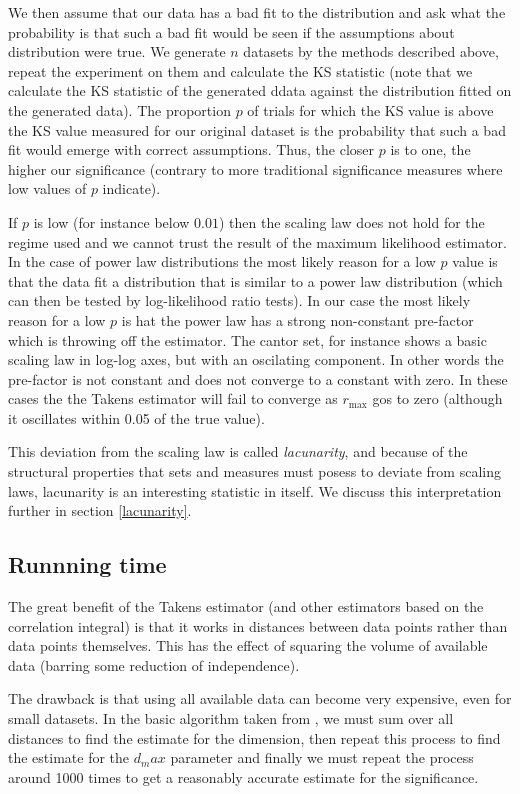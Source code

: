 \documentclass[11pt]{article}
\begin{document}
We then assume that our data has a bad fit to the distribution and ask what the probability is that such a bad fit would be seen if the assumptions about distribution were true. We generate $n$ datasets by the methods described above, repeat the experiment on them and calculate the KS statistic (note that we calculate the KS statistic of the generated ddata against the distribution fitted on the generated data). The proportion $p$ of trials for which the KS value is above the KS value measured for our original dataset is the probability that such a bad fit would emerge with correct assumptions. Thus, the closer $p$ is to one, the higher our significance (contrary to more traditional significance measures where low values of $p$ indicate).

If $p$ is low (for instance below $0.01$) then the scaling law does not hold for the regime used and we cannot trust the result of the maximum likelihood estimator. In the case of power law distributions the most likely reason for a low $p$ value is that the data fit a distribution that is similar to a power law distribution (which can then be tested by log-likelihood ratio tests). In our case the most likely reason for a low $p$ is hat the power law has a strong non-constant pre-factor which is throwing off the estimator. The cantor set, for instance shows a basic scaling law in log-log axes, but with an oscilating component. In other words the pre-factor is not constant and does not converge to a constant with zero. In these cases the the Takens estimator will fail to converge  as $r_{\max}$ gos to zero (although it oscillates within 0.05 of the true value).

This deviation from the scaling law is called \textit{lacunarity}, and because of the structural properties that sets and measures must posess to deviate from scaling laws, lacunarity is an interesting statistic in itself. We discuss this interpretation further in section \ref{lacunarity}.

\subsection{Runnning time}

The great benefit of the Takens estimator (and other estimators based on the correlation integral) is that it works in distances between data points rather than data points themselves. This has the effect of squaring the volume of available data (barring some reduction of independence).

The drawback is that using all available data can become very expensive, even for small datasets. In the basic algorithm taken from \cite{clauset2007power}, we must sum over all distances to find the estimate for the dimension, then repeat this process to find the estimate for the $d_max$ parameter and finally we must repeat the process around 1000 times to get a reasonably accurate estimate for the significance.
\end{document}
